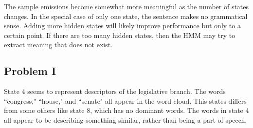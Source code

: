 \documentclass[12pt]{article} %
\begin{document}
The sample emissions become somewhat more meaningful as the number of states changes. In the special case of only one state, the sentence makes no grammatical sense. Adding more hidden states will likely improve performance but only to a certain point. If there are too many hidden states, then the HMM may try to extract meaning that does not exist.

\subsection{Problem I}

State 4 seems to represent descriptors of the legislative branch. The words ``congress," ``house," and ``senate" all appear in the word cloud. This states differs from some others like state 8, which has no dominant words. The words in state 4 all appear to be describing something similar, rather than being a part of speech.
\end{document}
